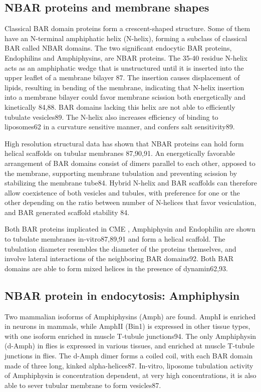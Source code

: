 	\subsection{NBAR proteins and membrane shapes}	
	Classical BAR domain proteins form a crescent-shaped structure. Some of them have an N-terminal amphiphatic helix (N-helix), forming a subclass of classical BAR called NBAR domains. The two significant endocytic BAR proteins, Endophilins and Amphiphysins, are NBAR proteins. The 35-40 residue N-helix acts as an amphiphatic wedge that is unstructured until it is inserted into the upper leaflet of a membrane bilayer 87. The insertion causes displacement of lipids, resulting in bending of the membrane, indicating that N-helix insertion into a membrane bilayer could favor membrane scission both energetically and kinetically 84,88. BAR domains lacking this helix are not able to efficiently tubulate vesicles89. The N-helix also increases efficiency of binding to liposomes62 in a curvature sensitive manner, and confers salt sensitivity89. 


	\vspace{5mm}
	High resolution structural data has shown that NBAR proteins can hold form helical scaffolds on tubular membranes 87,90,91. An energetically favorable arrangement of BAR domains consist of dimers parallel to each other, apposed to the membrane, supporting membrane tubulation and preventing scission by stabilizing the membrane tube84. Hybrid N-helix and BAR scaffolds can therefore allow coexistence of both vesicles and tubules, with preference for one or the other depending on the ratio between number of N-helices that favor vesiculation, and BAR generated scaffold stability 84. 


	\vspace{5mm}
	Both BAR proteins implicated in CME , Amphiphysin and Endophilin are shown to tubulate membranes in-vitro87,89,91 and form a helical scaffold. The tubulation diameter resembles the diameter of the proteins themselves, and involve lateral interactions of the neighboring BAR domains92. Both BAR domains are able to form mixed helices in the presence of dynamin62,93. 


	\subsection{NBAR protein in endocytosis: Amphiphysin }		
	Two mammalian isoforms of Amphiphysins (Amph) are found. AmphI is enriched in neurons in mammals, while AmphII (Bin1) is expressed in other tissue types, with one isoform enriched in muscle T-tubule junctions94. The only Amphiphysin (d-Amph) in flies is expressed in various tissues, and enriched at muscle T-tubule junctions in flies. The d-Amph dimer forms a coiled coil, with each BAR domain made of three long, kinked alpha-helices87. In-vitro, liposome tubulation activity of Amphiphysin is concentration dependent, at very high concentrations, it is also able to sever tubular membrane to form vesicles87. 


